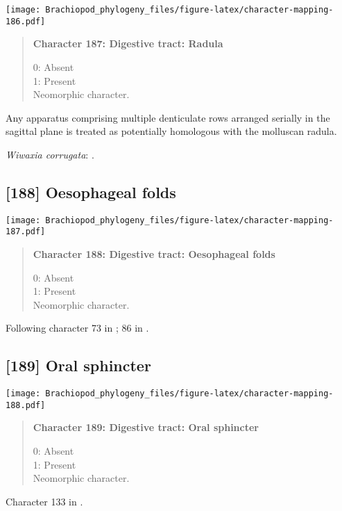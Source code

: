 \documentclass[openany]{book}
\theoremstyle{definition}
\theoremstyle{definition}
\theoremstyle{definition}
\theoremstyle{remark}
\begin{document}
\texttt{[image: Brachiopod\_phylogeny\_files/figure-latex/character-mapping-186.pdf]}

\begin{quote}
\textbf{Character 187: Digestive tract: Radula}

0: Absent\\
1: Present\\
Neomorphic character.
\end{quote}

Any apparatus comprising multiple denticulate rows arranged serially in
the sagittal plane is treated as potentially homologous with the
molluscan radula.

\hypertarget{Wiwaxia_corrugata-coding-187}{}
\emph{Wiwaxia corrugata}: \citet{Smith2012M}.

\subsection*{{[}188{]} Oesophageal folds}\label{oesophageal-folds}

\texttt{[image: Brachiopod\_phylogeny\_files/figure-latex/character-mapping-187.pdf]}

\begin{quote}
\textbf{Character 188: Digestive tract: Oesophageal folds}

0: Absent\\
1: Present\\
Neomorphic character.
\end{quote}

Following character 73 in \citet{Ponder1997}; 86 in \citet{Giribet2002}.

\subsection*{{[}189{]} Oral sphincter}\label{oral-sphincter}

\texttt{[image: Brachiopod\_phylogeny\_files/figure-latex/character-mapping-188.pdf]}

\begin{quote}
\textbf{Character 189: Digestive tract: Oral sphincter}

0: Absent\\
1: Present\\
Neomorphic character.
\end{quote}

Character 133 in \citet{Grobe2007}.
\end{document}
